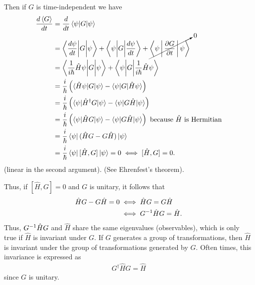     Then if $G$ is time-independent we have
    \begin{align*}
        \frac{d\braket{G}}{dt} &= \frac{d}{dt}\braket{\psi|G|\psi} \\
        &= \Braket{\frac{d\psi}{dt}\biggl|G\biggr|\psi} + \Braket{\psi\biggl|G\biggr|\frac{d\psi}{dt}} + \cancelto{0}{\Braket{\psi|\frac{\partial G}{\partial t}|\psi}} \\
        &= \Braket{\frac{1}{i\hbar}\hat{H}\psi\biggl|G\biggr|\psi} + \Braket{\psi\biggl|G\biggr|\frac{1}{i\hbar}\hat{H}\psi} \\
        &= \frac{i}{\hbar}\left( \braket{\hat{H}\psi|G|\psi} - \braket{\psi|G|\hat{H}\psi} \right) \\
        &= \frac{i}{\hbar}\left( \braket{\psi|\hat{H}^\dagger G|\psi} - \braket{\psi|G\hat{H}|\psi} \right) \\
        &= \frac{i}{\hbar}\left( \braket{\psi|\hat{H}G|\psi} - \braket{\psi|G\hat{H}|\psi} \right) \textrm{ because }\hat{H}\textrm{ is Hermitian} \\
        &= \frac{i}{\hbar}\bra{\psi}(\hat{H}G - G\hat{H})\ket{\psi} \\
        &= \frac{i}{\hbar}\bra{\psi}[\hat{H},G]\ket{\psi} = 0 \iff [\hat{H},G] = 0.
    \end{align*}
    (linear in the second argument). (See Ehrenfest's theorem).

    Thus, if $[\hat{H},G]=0$ and $G$ is unitary, it follows that
    \begin{align*}
        \hat{H}G-G\hat{H} = 0
            &\iff \hat{H}G = G\hat{H} \\
            &\iff { G }^{-1}\hat{H}G = \hat{H}.
    \end{align*}
    Thus, ${ G }^{-1}\hat{H}G$ and $\hat{H}$ share the same eigenvalues (observables), which is only true if $\hat{H}$ is invariant under $G$.
    If $G$ generates a group of transformations, then $\hat{H}$ is invariant under the group of transformations generated by $G$. Often times, this invariance is expressed as 
    \begin{align*}
        G^\dagger\hat{H}G = \hat{H}
    \end{align*}
    since $G$ is unitary.
    
